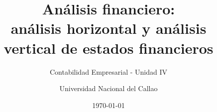 \newcommand{\cuadroComparativoTikz}{%
\begin{tikzpicture}[font=\tiny, scale=0.88, transform shape]
  \node[draw=BloqueVerde, fill=green!8, rounded corners=2pt, align=center, minimum width=2.5cm, minimum height=1.7cm] (h) at (0,0) {Horizontal\\Tiempo\\Tendencia};
  \node[draw=BloqueNaranja, fill=orange!10, rounded corners=2pt, align=center, minimum width=2.5cm, minimum height=1.7cm] (v) at (3.4,0) {Vertical\\Estructura\\Peso};
  \node[draw=BloqueMorado, fill=purple!8, rounded corners=2pt, align=center, minimum width=2.7cm] (d) at (1.7,-1.65) {Decisión\\mejor informada};
  \draw[-{Latex[length=2mm]}, thick, gray] (h) -- (d);
  \draw[-{Latex[length=2mm]}, thick, gray] (v) -- (d);
\end{tikzpicture}}

\title[Análisis financiero]{Análisis financiero:\\análisis horizontal y análisis vertical de estados financieros}
\subtitle{Contabilidad Empresarial - Unidad IV}
\author{Universidad Nacional del Callao}
\date{\today}
